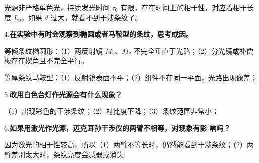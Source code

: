 \documentclass[12pt]{article}
\begin{document}
光源非严格单色光，持续发光时间 $\tau_0$ 有限，存在时间上的相干性，对应着相干长度 $L_0$。如果 $d$ 过大，就看不到干涉条纹了。

4.\textbf{在实验中有时会观察到椭圆或者马鞍型的条纹，思考成因。} 

等倾条纹椭圆形：（1）两反射镜 $M_1$、$M_2$ 不完全垂直于光路；（2）分光镜或补偿板存在楔角且不完全平行。

等厚条纹马鞍型：（1）反射镜表面不平；（2）组件不在同一平面，光路出现像差；

5.\textbf{改用白色台灯作光源会有什么现象？}

（1）出现彩色的干涉条纹；（2）衬比度下降；（3）条纹范围非常小；

6.\textbf{如果用激光作光源，迈克耳孙干涉仪的两臂不相等，对现象有影
响吗？}

因为激光的相干性较高，所以（1）两臂不等长时，仍然能看到干涉条纹；（2）两臂差别太大时，条纹亮度会减弱或消失
\end{document}
